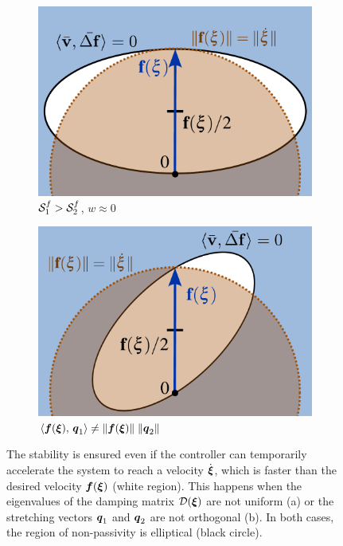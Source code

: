 \iflong
\begin{figure}[htbp]
    \centering
    \begin{subfigure}{0.49\columnwidth}
      \centerline{\includegraphics[width=\textwidth]{figures/passivity_analysis_wide}}
	  \caption{$\mathcal{S}_1^f > \mathcal{S}_2^f$, $w \approx 0$}
	  \label{fig:passivity_analysis_wide}
    \end{subfigure}\hfill%
    \begin{subfigure}{0.49\columnwidth}
    \includegraphics[width=\textwidth]{figures/passivity_analysis_skew}
	\caption{$\left\langle {\boldsymbol{f}(\boldsymbol{\xi})}, \, {\boldsymbol{q}_1} \right\rangle \neq \| \boldsymbol{f}(\boldsymbol{\xi})\| \; \| \boldsymbol{q}_2\| $ }
      \label{fig:passivity_analysis_skew}
    \end{subfigure}
	\caption{
		The stability is ensured even if the controller can temporarily accelerate the system to reach a velocity $\dot{\boldsymbol{\xi}}$, which is faster than the desired velocity $\boldsymbol{f}(\boldsymbol{\xi})$ (white region).
		This happens when the eigenvalues of the damping matrix $\mathcal{D}(\boldsymbol{\xi})$ are not uniform (a) or the stretching vectors $\boldsymbol{q}_1$ and $\boldsymbol{q}_2$ are not orthogonal (b). 
	In both cases, the region of non-passivity is elliptical (black circle).
}
	\label{fig:passivity_analysis_varied}
\end{figure}
\fi


